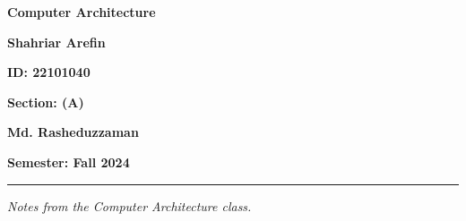 \begin{titlepage}
   \centering
   \vspace*{1.5cm}
   
   {\Huge {}\par}
   {\Huge\bfseries Computer Architecture\par}
   \vspace{1.5cm}
   
   {\LARGE {}\par}
   {\LARGE\textbf{Shahriar Arefin}\par}
   \vspace{0.5cm}
   {\large\textbf{ID: 22101040}\par}
   \vspace{0.5cm}
   {\large\textbf{Section: (A)}\par}

   \vspace{1cm}
   {\LARGE {}\par}
   {\LARGE\textbf{Md. Rasheduzzaman}\par}
   \vfill

   {\large\textbf{Semester: Fall 2024}\par}
   \vspace{1cm}

   \hrule \vspace{0.2cm}
   {\small \textit{Notes from the Computer Architecture class.}}
\end{titlepage}
